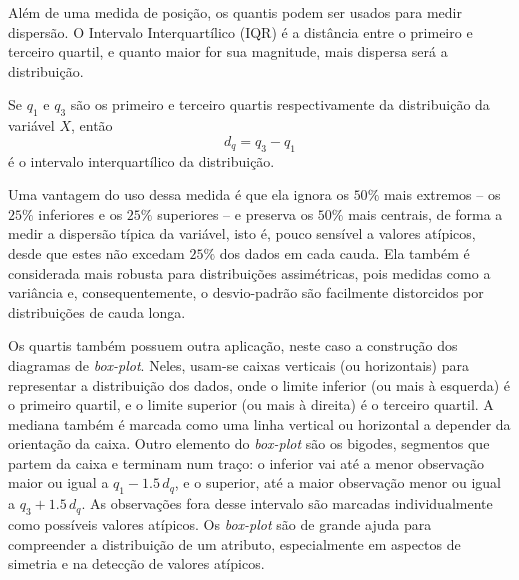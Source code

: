 Além de uma medida de posição, os quantis podem ser usados para medir dispersão.
O Intervalo Interquartílico (IQR) é a distância entre o primeiro e terceiro quartil, e
quanto maior for sua magnitude, mais dispersa será a distribuição.
\begin{def:iqr}
Se $q_1$ e $q_3$ são os primeiro e terceiro quartis respectivamente da distribuição da
variável $X$, então
\[
    d_q =  q_3 - q_1
\]
é o intervalo interquartílico da distribuição.
\end{def:iqr}
Uma vantagem do uso dessa medida é que ela ignora os $50\%$ mais extremos -- os $25\%$
inferiores e os $25\%$ superiores -- e preserva os $50\%$ mais centrais,
de forma a medir a dispersão típica da variável, isto é, pouco sensível a valores
atípicos, desde que estes não excedam $25\%$ dos dados em cada cauda.
Ela também é considerada mais robusta para distribuições assimétricas, pois medidas
como a variância e, consequentemente, o desvio-padrão são facilmente distorcidos por
distribuições de cauda longa.

Os quartis também possuem outra aplicação, neste caso a construção dos diagramas de
\textit{box-plot}.
Neles, usam-se caixas verticais (ou horizontais) para representar a distribuição dos dados,
onde o limite inferior (ou mais à esquerda) é o primeiro quartil, e o limite superior
(ou mais à direita) é o terceiro quartil.
A mediana também é marcada como uma linha vertical ou horizontal a depender da orientação
da caixa.
Outro elemento do \textit{box-plot} são os bigodes, segmentos que partem da caixa e
terminam num traço: o inferior vai até a menor observação maior ou igual a
$q_1 - 1.5\, d_q$, e o superior, até a maior observação menor ou igual a $q_3 + 1.5\, d_q$.
As observações fora desse intervalo são marcadas individualmente como possíveis valores
atípicos.
Os \textit{box-plot} são de grande ajuda para compreender a distribuição de um atributo,
especialmente em aspectos de simetria e na detecção de valores atípicos.
